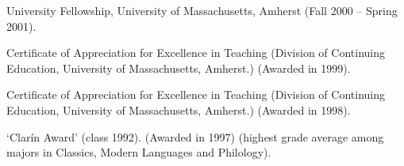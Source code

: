 \documentclass[11pt]{article}
\begin{document}
University Fellowship, University of Massachusetts, Amherst (Fall 2000
-- Spring 2001).

Certificate of Appreciation for Excellence in Teaching (Division of
Continuing Education, University of Massachusetts, Amherst.) (Awarded
in 1999).

Certificate of Appreciation for Excellence in Teaching (Division of
Continuing Education, University of Massachusetts, Amherst.) (Awarded
in 1998).

`Clar\'in Award' (class 1992). (Awarded in 1997) (highest grade average among majors in Classics, Modern Languages and Philology).


\end{document}
